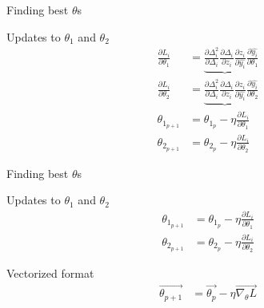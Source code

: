 \begin{frame}{Finding best $\theta$s}
\begin{block}{Updates to $\theta_1$ and $\theta_2$}
	\begin{align}
	\frac{\partial L_i}{\partial \theta_1} &=
	\underbrace{ 
		\frac{\partial \Delta_i^2}{\partial \Delta_i}  
		\frac{\partial \Delta_i}{\partial z_i}  
		\frac{\partial z_i}{\partial \hat{y_i}} }
	\frac{\partial \hat{y_i}}{\partial \theta_1} \\
	\frac{\partial L_i}{\partial \theta_2} &=
	\underbrace{ 
		\frac{\partial \Delta_i^2}{\partial \Delta_i}  
		\frac{\partial \Delta_i}{\partial z_i}  
		\frac{\partial z_i}{\partial \hat{y_i}} }
	\frac{\partial \hat{y_i}}{\partial \theta_2} \\
	\theta_{1_{p+1}} &= \theta_{1_p} - \eta \frac{\partial L_i}{\partial \theta_1} \\
	\theta_{2_{p+1}} &= \theta_{2_p} - \eta \frac{\partial L_i}{\partial \theta_2} 
	\end{align}
\end{block}
\end{frame}

\begin{frame}{Finding best $\theta$s}
\begin{block}{Updates to $\theta_1$ and $\theta_2$}
	\begin{align}
	\theta_{1_{p+1}} &= \theta_{1_p} - \eta \frac{\partial L_i}{\partial \theta_1} \\
	\theta_{2_{p+1}} &= \theta_{2_p} - \eta \frac{\partial L_i}{\partial \theta_2}  
	\end{align}
\end{block}
\begin{block}{Vectorized format}
	\begin{align}
	\vec{\theta_{p+1}} & =  \vec{\theta_p} - \eta \vec{\nabla_\theta L}
	\end{align}
\end{block}
\end{frame}